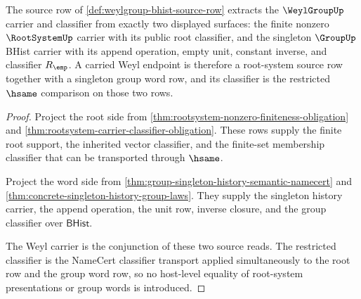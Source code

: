 \begin{theorem}
\label{thm:weylgroup-rootsystem-group-carrier-row}
The source row of \autoref{def:weylgroup-bhist-source-row} extracts the
$\WeylGroupUp$ carrier and classifier from exactly two displayed surfaces:
the finite nonzero $\RootSystemUp$ carrier with its public root classifier, and
the singleton $\GroupUp$ BHist carrier with its append operation, empty unit,
constant inverse, and classifier $R_{\emp}$. A carried Weyl endpoint is
therefore a root-system source row together with a singleton group word row,
and its classifier is the restricted $\hsame$ comparison on those two rows.
\end{theorem}
\begin{proof}
Project the root side from
\autoref{thm:rootsystem-nonzero-finiteness-obligation} and
\autoref{thm:rootsystem-carrier-classifier-obligation}. These rows supply the
finite root support, the inherited vector classifier, and the finite-set
membership classifier that can be transported through $\hsame$.

Project the word side from
\autoref{thm:group-singleton-history-semantic-namecert} and
\autoref{thm:concrete-singleton-history-group-laws}. They supply the singleton
history carrier, the append operation, the unit row, inverse closure, and the
group classifier over $\mathsf{BHist}$.

The Weyl carrier is the conjunction of these two source reads. The restricted
classifier is the NameCert classifier transport applied simultaneously to the
root row and the group word row, so no host-level equality of root-system
presentations or group words is introduced.
\end{proof}


